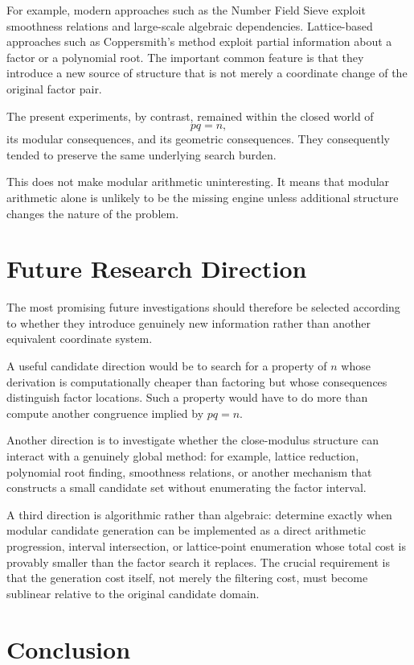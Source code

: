 \documentclass[11pt,a4paper]{article}
\begin{document}
For example, modern approaches such as the Number Field Sieve exploit smoothness relations and large-scale algebraic dependencies. Lattice-based approaches such as Coppersmith's method exploit partial information about a factor or a polynomial root. The important common feature is that they introduce a new source of structure that is not merely a coordinate change of the original factor pair.

The present experiments, by contrast, remained within the closed world of
\[
    pq=n,
\]
its modular consequences, and its geometric consequences. They consequently tended to preserve the same underlying search burden.

This does not make modular arithmetic uninteresting. It means that modular arithmetic alone is unlikely to be the missing engine unless additional structure changes the nature of the problem.

\section{Future Research Direction}

The most promising future investigations should therefore be selected according to whether they introduce genuinely new information rather than another equivalent coordinate system.

A useful candidate direction would be to search for a property of $n$ whose derivation is computationally cheaper than factoring but whose consequences distinguish factor locations. Such a property would have to do more than compute another congruence implied by $pq=n$.

Another direction is to investigate whether the close-modulus structure can interact with a genuinely global method: for example, lattice reduction, polynomial root finding, smoothness relations, or another mechanism that constructs a small candidate set without enumerating the factor interval.

A third direction is algorithmic rather than algebraic: determine exactly when modular candidate generation can be implemented as a direct arithmetic progression, interval intersection, or lattice-point enumeration whose total cost is provably smaller than the factor search it replaces. The crucial requirement is that the generation cost itself, not merely the filtering cost, must become sublinear relative to the original candidate domain.

\section{Conclusion}
\end{document}
